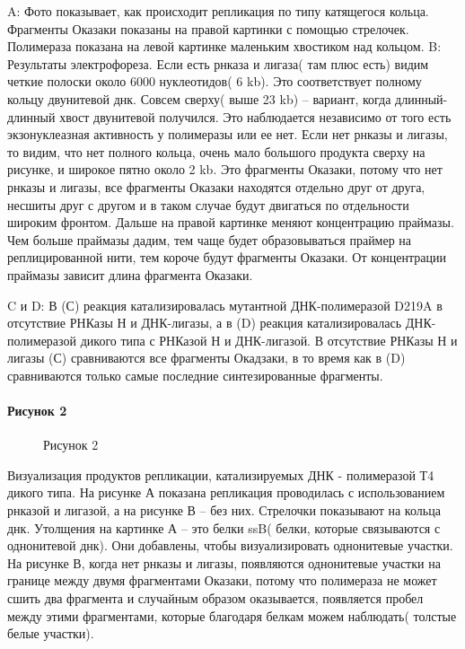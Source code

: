 A: Фото показывает, как происходит репликация по типу катящегося кольца. Фрагменты Оказаки показаны на правой картинки с помощью стрелочек. Полимераза показана на левой картинке маленьким хвостиком над кольцом.
B: Результаты электрофореза. Если есть рнказа и лигаза( там плюс есть) видим четкие полоски около 6000 нуклеотидов( 6 kb). Это соответствует полному кольцу двунитевой днк. Совсем сверху( выше 23 kb) – вариант, когда длинный-длинный хвост двунитевой получился. Это наблюдается независимо от того есть экзонуклеазная активность у полимеразы или ее нет. Если нет рнказы и лигазы, то видим, что нет полного кольца, очень мало большого продукта сверху на рисунке, и широкое пятно около 2 kb. Это фрагменты Оказаки, потому что нет рнказы и лигазы, все фрагменты Оказаки находятся отдельно друг от друга, несшиты друг с другом и в таком случае будут двигаться по отдельности широким фронтом. Дальше на правой картинке меняют концентрацию праймазы. Чем больше праймазы дадим, тем чаще будет образовываться праймер на реплицированной нити, тем короче будут фрагменты Оказаки. От концентрации праймазы зависит длина фрагмента Оказаки.

C и D: В (С) реакция катализировалась мутантной ДНК-полимеразой D219A в отсутствие РНКазы Н и ДНК-лигазы, а в (D) реакция катализировалась ДНК-полимеразой дикого типа с РНКазой Н и ДНК-лигазой. В отсутствие РНКазы Н и лигазы (С) сравниваются все фрагменты Окадзаки, в то время как в (D) сравниваются только самые последние синтезированные фрагменты.

\paragraph{Рисунок 2}

\begin{figure}[h]
\begin{minipage}[h]{0.49\linewidth}
\center{\texttt{[image: 5\_3]} }
\end{minipage}
\hfill
\begin{minipage}[h]{0.49\linewidth}
\center{\texttt{[image: 5\_4]} }
\end{minipage}
\caption{Рисунок 2}
\label{fig:5_34}
\end{figure}

Визуализация продуктов репликации, катализируемых ДНК - полимеразой Т4 дикого типа. На рисунке А показана репликация проводилась с использованием рнказой и лигазой, а на рисунке В – без них. Стрелочки показывают на кольца днк. Утолщения на картинке А – это белки ssB( белки, которые связываются с однонитевой днк). Они добавлены, чтобы визуализировать однонитевые участки. На рисунке В, когда нет рнказы и лигазы, появляются однонитевые участки на границе между двумя фрагментами Оказаки, потому что полимераза не может сшить два фрагмента и случайным образом оказывается, появляется пробел между этими фрагментами, которые благодаря белкам можем наблюдать( толстые белые участки).\

